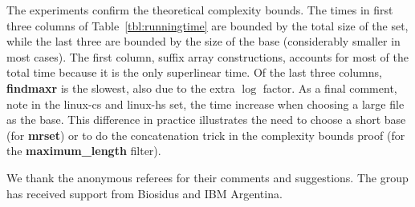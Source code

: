 \documentclass[submission]{dmtcs}
\newcommand\+[1]{\mathcal{#1}}
\begin{document}
The experiments confirm the theoretical complexity bounds. 
The times in first three columns of Table~\ref{tbl:runningtime} are bounded by the
total size of the set, while the last three are
bounded by the size of the base (considerably smaller in most cases).
The first column, suffix array constructions, accounts for most 
of the total time because it is the only superlinear time. 
Of the last three columns, {\bf findmaxr} is
the slowest, also due to the extra $\log$ factor.
As a final comment, note in the linux-cs and linux-hs set, the time increase 
 when choosing a large file as the base. This difference in practice 
 illustrates the need to choose a short base (for \textbf{mrset}) or to do the
concatenation trick in the complexity bounds proof (for the
\textbf{maximum\_length} filter).
\bigskip

\acknowledgments
We thank the anonymous referees for their comments and suggestions.
The group has received support from Biosidus and IBM Argentina.






\end{document}
